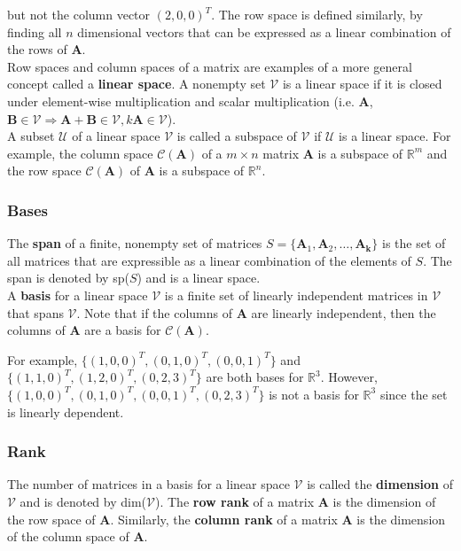 \documentclass[11pt]{article}
\theoremstyle{definition}
\begin{document}
but not the column vector $(2,0,0)^T$.  The row space is defined similarly, by finding all $n$ dimensional vectors that can be expressed as a linear combination of the rows of $\mathbf{A}$.  \\

Row spaces and column spaces of a matrix are examples of a more general concept called a \textbf{linear space}.  A nonempty set $\mathcal{V}$ is a linear space if it is closed under element-wise multiplication and scalar multiplication (i.e. $\mathbf{A}$, $\mathbf{B} \in \mathcal{V} \Rightarrow \mathbf{A} + \mathbf{B} \in \mathcal{V}, k\mathbf{A} \in \mathcal{V}$).\\

A subset $\mathcal{U}$ of a linear space $\mathcal{V}$ is called a subspace of $\mathcal{V}$ if $\mathcal{U}$ is a linear space.  For example, the column space $\mathcal{C}(\mathbf{A})$ of a $m \times n$ matrix $\mathbf{A}$ is a subspace of $\mathbb{R}^m$ and the row space $\mathcal{C}(\mathbf{A})$ of $\mathbf{A}$ is a subspace of $
\mathbb{R}^n$.


\subsubsection{Bases}
The \textbf{span} of a finite, nonempty set of matrices $S = \{\mathbf{A}_1, \mathbf{A}_2, \hdots, \mathbf{A_k}\}$ is the set of all matrices that are expressible as a linear combination of the elements of $S$.  The span is denoted by sp($S$) and is a linear space.\\

A \textbf{basis} for a linear space $\mathcal{V}$ is a finite set of linearly independent matrices in $\mathcal{V}$ that spans $\mathcal{V}$.  Note that if the columns of $\mathbf{A}$ are linearly independent, then the columns of $\mathbf{A}$ are a basis for $\mathcal{C}(\mathbf{A})$.

For example, $\{(1,0,0)^T, (0,1,0)^T, (0,0,1)^T\}$ and $\{(1,1,0)^T, (1,2,0)^T, (0,2,3)^T\}$ are both bases for $\mathbb{R}^3$.  However, $\{(1,0,0)^T, (0,1,0)^T, (0,0,1)^T, (0,2,3)^T\}$ is not a basis for $\mathbb{R}^3$ since the set is linearly dependent.

\subsubsection{Rank}
The number of matrices in a basis for a linear space $\mathcal{V}$ is called the \textbf{dimension} of $\mathcal{V}$ and is denoted by dim($\mathcal{V}$).  The \textbf{row rank} of a matrix $\mathbf{A}$ is the dimension of the row space of $\mathbf{A}$.  Similarly, the \textbf{column rank} of a matrix $\mathbf{A}$ is the dimension of the column space of $\mathbf{A}$.  \\
\end{document}
